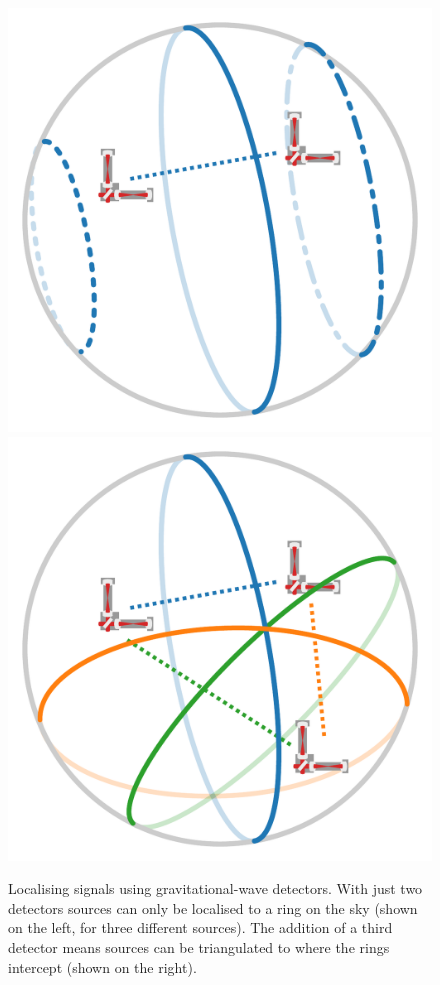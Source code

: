\begin{colsection}
\begin{colsection}
\begin{figure}[t]
    \begin{center}
        \includegraphics[width=0.4\linewidth]{images/triangulate_1.pdf}
        \includegraphics[width=0.4\linewidth]{images/triangulate_2.pdf}
    \end{center}
    \caption[Localising signals using gravitational-wave detectors]{
        Localising signals using gravitational-wave detectors. With just two detectors sources can only be localised to a ring on the sky (shown on the left, for three different sources). The addition of a third detector means sources can be triangulated to where the rings intercept (shown on the right).
        }\label{fig:triangulate}
\end{figure}


\end{colsection}
\end{colsection}
